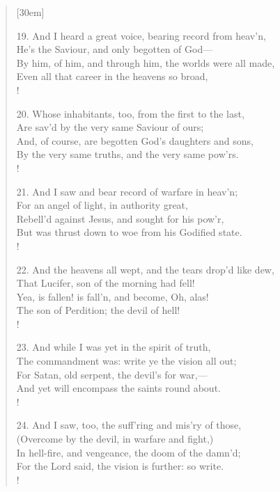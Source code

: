 \begin{verse}[30em]
\begin{altverse}
				19. And I heard a great voice, bearing record from heav'n, \\ 
				He's the Saviour, and only begotten of God--- \\ 
				By him, of him, and through him, the worlds were all made, \\ 
				Even all that career in the heavens so broad, \\!
				 
				20. Whose inhabitants, too, from the first to the last, \\ 
				Are sav'd by the very same Saviour of ours; \\ 
				And, of course, are begotten God's daughters and sons, \\ 
				By the very same truths, and the very same pow'rs. \\!
				 
				21. And I saw and bear record of warfare in heav'n; \\ 
				For an angel of light, in authority great, \\ 
				Rebell'd against Jesus, and sought for his pow'r, \\ 
				But was thrust down to woe from his Godified state. \\! 
				 
				22. And the heavens all wept, and the tears drop'd like dew, \\ 
				That Lucifer, son of the morning had fell! \\ 
				Yea, is fallen! is fall'n, and become, Oh, alas! \\ 
				The son of Perdition; the devil of hell! \\!
				 
				23. And while I was yet in the spirit of truth, \\ 
				The commandment was: write ye the vision all out; \\ 
				For Satan, old serpent, the devil's for war,--- \\ 
				And yet will encompass the saints round about. \\!
				 
				24. And I saw, too, the suff'ring and mis'ry of those, \\ 
				(Overcome by the devil, in warfare and fight,) \\ 
				In hell-fire, and vengeance, the doom of the damn'd; \\ 
				For the Lord said, the vision is further: so write. \\!
				 

\end{altverse}
\end{verse}
